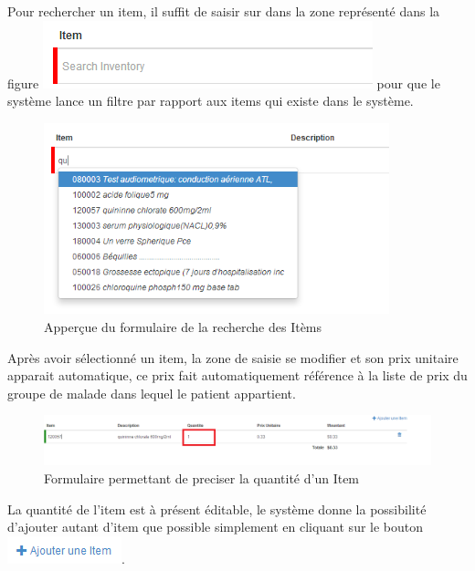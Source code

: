 \documentclass[12pt,a4paper]{report}
\begin{document}
\newpage
Pour rechercher un item, il suffit de saisir sur dans la zone représenté dans la figure 
\includegraphics[scale=0.7]{pic/RechercheItem.png} pour que le système lance un filtre par rapport aux items qui existe dans le système.

\begin{figure}[h]
\begin{center}
\includegraphics[width=10cm]{pic/AppRechercheItem.png}
\end{center}
\caption{Apperçue du formulaire de la recherche des Itèms}
\label{Apperçue du formulaire de la recherche des Itèms}
\end{figure}

Après avoir sélectionné un item, la zone de saisie se modifier et son prix unitaire apparait automatique, ce prix fait automatiquement référence à la liste de prix du groupe de malade dans lequel le patient appartient. 


\begin{figure}[h]
\begin{center}
\includegraphics[width=14cm]{pic/UpdateItem.png}
\end{center}
\caption{Formulaire permettant de preciser la quantité d'un Item}
\label{Formulaire permettant de preciser la quantité d'un Item}
\end{figure}


La quantité de l'item est à présent éditable, le système donne la possibilité d'ajouter autant d'item que possible simplement en cliquant sur le bouton 
\includegraphics[scale=0.7]{pic/PlusAddItem.png}.
 
\end{document}
